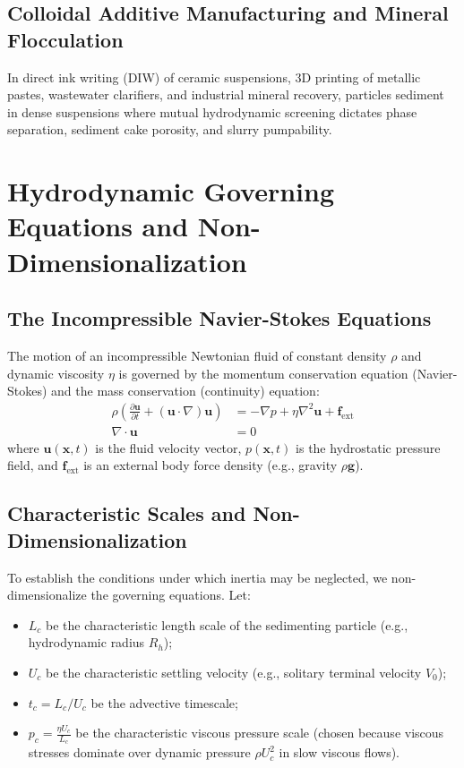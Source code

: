 \documentclass[11pt,a4paper]{article}
\begin{document}
\subsection{Colloidal Additive Manufacturing and Mineral Flocculation}
In direct ink writing (DIW) of ceramic suspensions, 3D printing of metallic pastes, wastewater clarifiers, and industrial mineral recovery, particles sediment in dense suspensions where mutual hydrodynamic screening dictates phase separation, sediment cake porosity, and slurry pumpability.

\section{Hydrodynamic Governing Equations and Non-Dimensionalization}

\subsection{The Incompressible Navier-Stokes Equations}
The motion of an incompressible Newtonian fluid of constant density $\rho$ and dynamic viscosity $\eta$ is governed by the momentum conservation equation (Navier-Stokes) and the mass conservation (continuity) equation:
\begin{align}
    \rho \left( \frac{\partial \mathbf{u}}{\partial t} + (\mathbf{u} \cdot \nabla) \mathbf{u} \right) &= -\nabla p + \eta \nabla^2 \mathbf{u} + \mathbf{f}_{\text{ext}} \label{eq:navier_stokes} \\
    \nabla \cdot \mathbf{u} &= 0 \label{eq:continuity}
\end{align}
where $\mathbf{u}(\mathbf{x}, t)$ is the fluid velocity vector, $p(\mathbf{x}, t)$ is the hydrostatic pressure field, and $\mathbf{f}_{\text{ext}}$ is an external body force density (e.g., gravity $\rho \mathbf{g}$).

\subsection{Characteristic Scales and Non-Dimensionalization}
To establish the conditions under which inertia may be neglected, we non-dimensionalize the governing equations. Let:
\begin{itemize}
    \item $L_c$ be the characteristic length scale of the sedimenting particle (e.g., hydrodynamic radius $R_h$);
    \item $U_c$ be the characteristic settling velocity (e.g., solitary terminal velocity $V_0$);
    \item $t_c = L_c / U_c$ be the advective timescale;
    \item $p_c = \frac{\eta U_c}{L_c}$ be the characteristic viscous pressure scale (chosen because viscous stresses dominate over dynamic pressure $\rho U_c^2$ in slow viscous flows).
\end{itemize}
\end{document}
